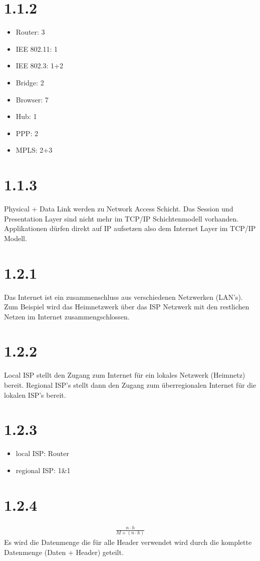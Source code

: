 \documentclass[a4paper,url]{article}
\begin{document}
\section*{1.1.2}
\begin{itemize}
	\item Router: 3
	\item IEE 802.11: 1
	\item IEE 802.3: 1+2
	\item Bridge: 2
	\item Browser: 7
	\item Hub: 1
	\item PPP: 2
	\item MPLS: 2+3
\end{itemize}

\section*{1.1.3}
Physical + Data Link werden zu Network Access Schicht. Das Session und Presentation Layer sind nicht mehr im TCP/IP Schichtenmodell vorhanden.
Applikationen dürfen direkt auf IP aufsetzen also dem Internet Layer im TCP/IP Modell.

\section*{1.2.1}
Das Internet ist ein zusammenschluss aus verschiedenen Netzwerken (LAN's). Zum Beispiel wird das Heimnetzwerk über das ISP Netzwerk mit den restlichen Netzen im Internet zusammengschlossen.

\section*{1.2.2}
Local ISP stellt den Zugang zum Internet für ein lokales Netzwerk (Heimnetz) bereit.
Regional ISP's stellt dann den Zugang zum überregionalen Internet für die lokalen ISP's bereit.

\section*{1.2.3}
\begin{itemize}
	\item local ISP: Router
	\item regional ISP: 1\&1
\end{itemize}

\section*{1.2.4}
\begin{align}
	\frac{n\cdot h}{M + (n \cdot h)}
\end{align}
Es wird die Datenmenge die für alle Header verwendet wird durch die komplette Datenmenge (Daten + Header) geteilt.
\end{document}
